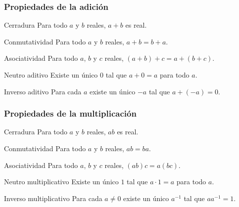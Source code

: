 \documentclass[12pt]{article}
\begin{document}
\subsubsection{Propiedades de la adición}

\begin{axioma}[A1]{Cerradura}
Para todo $a$ y $b$ reales, $a + b$ es real.
\end{axioma}

\begin{axioma}[A2]{Conmutatividad}
Para todo $a$ y $b$ reales, $a + b = b + a$.
\end{axioma}

\begin{axioma}[A3]{Asociatividad}
Para todo $a$, $b$ y $c$ reales, $(a+b)+c = a+(b+c)$.
\end{axioma}

\begin{axioma}[A4]{Neutro aditivo}
Existe un único $0$ tal que $a + 0 = a$ para todo $a$.
\end{axioma}

\begin{axioma}[A5]{Inverso aditivo}
Para cada $a$ existe un único $-a$ tal que $a + (-a) = 0$.
\end{axioma}

\subsubsection{Propiedades de la multiplicación}

\begin{axioma}[M1]{Cerradura}
Para todo $a$ y $b$ reales, $ab$ es real.
\end{axioma}

\begin{axioma}[M2]{Conmutatividad}
Para todo $a$ y $b$ reales, $ab = ba$.
\end{axioma}

\begin{axioma}[M3]{Asociatividad}
Para todo $a$, $b$ y $c$ reales, $(ab)c = a(bc)$.
\end{axioma}

\begin{axioma}[M4]{Neutro multiplicativo}
Existe un único $1$ tal que $a \cdot 1 = a$ para todo $a$.
\end{axioma}

\begin{axioma}[M5]{Inverso multiplicativo}
Para cada $a \neq 0$ existe un único $a^{-1}$ tal que $a a^{-1} = 1$.
\end{axioma}
\end{document}
